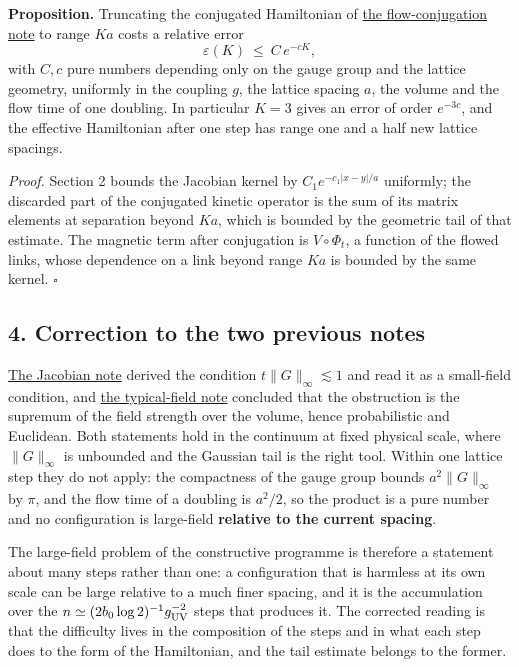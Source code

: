 \documentclass[11pt,a4paper]{article}
\begin{document}
\textbf{Proposition.} Truncating the conjugated Hamiltonian of
\href{flow-conjugation-truncation.md}{the flow-conjugation note} to
range \(Ka\) costs a relative error \[\varepsilon(K)\ \le\ C\,e^{-cK},\]
with \(C,c\) pure numbers depending only on the gauge group and the
lattice geometry, uniformly in the coupling \(g\), the lattice spacing
\(a\), the volume and the flow time of one doubling. In particular
\(K=3\) gives an error of order \(e^{-3c}\), and the effective
Hamiltonian after one step has range one and a half new lattice
spacings.

\emph{Proof.} Section 2 bounds the Jacobian kernel by
\(C_1e^{-c_1|x-y|/a}\) uniformly; the discarded part of the conjugated
kinetic operator is the sum of its matrix elements at separation beyond
\(Ka\), which is bounded by the geometric tail of that estimate. The
magnetic term after conjugation is \(V\circ\Phi_t\), a function of the
flowed links, whose dependence on a link beyond range \(Ka\) is bounded
by the same kernel. \(\square\)

\hypertarget{correction-to-the-two-previous-notes}{%
\subsection{4. Correction to the two previous
notes}\label{correction-to-the-two-previous-notes}}

\href{flow-jacobian-truncation-error.md}{The Jacobian note} derived the
condition \(t\|G\|_\infty\lesssim1\) and read it as a small-field
condition, and \href{typical-field-strength-window.md}{the typical-field
note} concluded that the obstruction is the supremum of the field
strength over the volume, hence probabilistic and Euclidean. Both
statements hold in the continuum at fixed physical scale, where
\(\|G\|_\infty\) is unbounded and the Gaussian tail is the right tool.
Within one lattice step they do not apply: the compactness of the gauge
group bounds \(a^2\|G\|_\infty\) by \(\pi\), and the flow time of a
doubling is \(a^2/2\), so the product is a pure number and no
configuration is large-field \textbf{relative to the current spacing}.

The large-field problem of the constructive programme is therefore a
statement about many steps rather than one: a configuration that is
harmless at its own scale can be large relative to a much finer spacing,
and it is the accumulation over the
\(n\simeq(2b_0\log2)^{-1}g_{\rm UV}^{-2}\) steps that produces it. The
corrected reading is that the difficulty lives in the composition of the
steps and in what each step does to the form of the Hamiltonian, and the
tail estimate belongs to the former.
\end{document}
